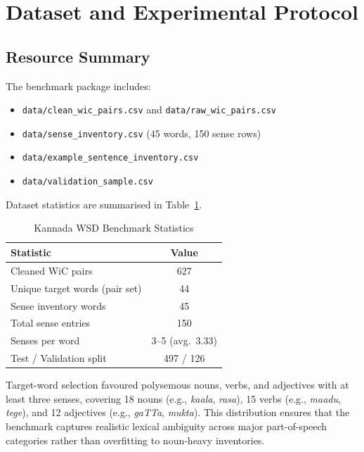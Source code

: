 \documentclass[conference]{IEEEtran}
\begin{document}
\section{Dataset and Experimental Protocol}

\subsection{Resource Summary}

The benchmark package includes:
\begin{itemize}
  \item \texttt{data/clean\_wic\_pairs.csv} and \texttt{data/raw\_wic\_pairs.csv}
  \item \texttt{data/sense\_inventory.csv} (45 words, 150 sense rows)
  \item \texttt{data/example\_sentence\_inventory.csv}
  \item \texttt{data/validation\_sample.csv}
\end{itemize}

\noindent Dataset statistics are summarised in Table~\ref{tab:datastats}.

\begin{table}[t!]
\caption{Kannada WSD Benchmark Statistics}
\label{tab:datastats}
\centering
\begin{tabular}{lc}
\toprule
\textbf{Statistic} & \textbf{Value}\\
\midrule
Cleaned WiC pairs & 627 \\
Unique target words (pair set) & 44 \\
Sense inventory words & 45 \\
Total sense entries & 150 \\
Senses per word & 3--5 (avg.\ 3.33) \\
Test / Validation split & 497 / 126 \\
\bottomrule
\end{tabular}
\end{table}

Target-word selection favoured polysemous nouns, verbs, and adjectives with at
least three senses, covering 18 nouns (e.g., \textit{kaala}, \textit{rasa}),
15 verbs (e.g., \textit{maadu}, \textit{tege}), and 12 adjectives
(e.g., \textit{gaTTa}, \textit{mukta}). This distribution ensures that the
benchmark captures realistic lexical ambiguity across major part-of-speech
categories rather than overfitting to noun-heavy inventories.
\end{document}
